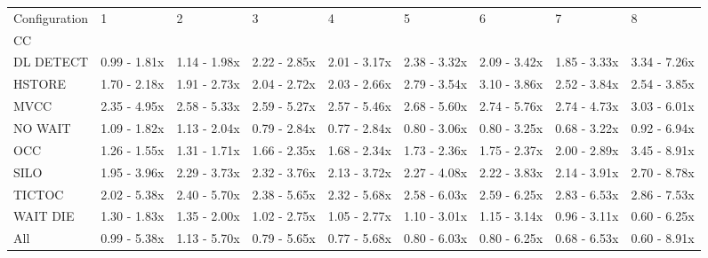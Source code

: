 \begin{tabular}{lllllllll}
\toprule
Configuration &             1 &             2 &             3 &             4 &             5 &             6 &             7 &             8 \\
CC        &               &               &               &               &               &               &               &               \\
\midrule
DL DETECT &  0.99 - 1.81x &  1.14 - 1.98x &  2.22 - 2.85x &  2.01 - 3.17x &  2.38 - 3.32x &  2.09 - 3.42x &  1.85 - 3.33x &  3.34 - 7.26x \\
HSTORE    &  1.70 - 2.18x &  1.91 - 2.73x &  2.04 - 2.72x &  2.03 - 2.66x &  2.79 - 3.54x &  3.10 - 3.86x &  2.52 - 3.84x &  2.54 - 3.85x \\
MVCC      &  2.35 - 4.95x &  2.58 - 5.33x &  2.59 - 5.27x &  2.57 - 5.46x &  2.68 - 5.60x &  2.74 - 5.76x &  2.74 - 4.73x &  3.03 - 6.01x \\
NO WAIT   &  1.09 - 1.82x &  1.13 - 2.04x &  0.79 - 2.84x &  0.77 - 2.84x &  0.80 - 3.06x &  0.80 - 3.25x &  0.68 - 3.22x &  0.92 - 6.94x \\
OCC       &  1.26 - 1.55x &  1.31 - 1.71x &  1.66 - 2.35x &  1.68 - 2.34x &  1.73 - 2.36x &  1.75 - 2.37x &  2.00 - 2.89x &  3.45 - 8.91x \\
SILO      &  1.95 - 3.96x &  2.29 - 3.73x &  2.32 - 3.76x &  2.13 - 3.72x &  2.27 - 4.08x &  2.22 - 3.83x &  2.14 - 3.91x &  2.70 - 8.78x \\
TICTOC    &  2.02 - 5.38x &  2.40 - 5.70x &  2.38 - 5.65x &  2.32 - 5.68x &  2.58 - 6.03x &  2.59 - 6.25x &  2.83 - 6.53x &  2.86 - 7.53x \\
WAIT DIE  &  1.30 - 1.83x &  1.35 - 2.00x &  1.02 - 2.75x &  1.05 - 2.77x &  1.10 - 3.01x &  1.15 - 3.14x &  0.96 - 3.11x &  0.60 - 6.25x \\
All       &  0.99 - 5.38x &  1.13 - 5.70x &  0.79 - 5.65x &  0.77 - 5.68x &  0.80 - 6.03x &  0.80 - 6.25x &  0.68 - 6.53x &  0.60 - 8.91x \\
\bottomrule
\end{tabular}
